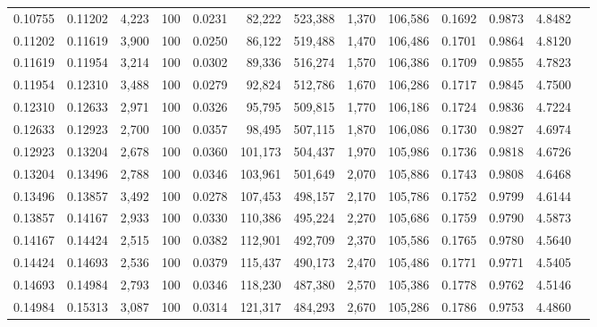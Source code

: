 \begin{tabular}{rrrrrrrrrrrrr}
0.10755 & 0.11202 & 4,223 & 100 &                                     0.0231 &  82,222 & 523,388 &   1,370 & 106,586 & 0.1692 & 0.9873 & 4.8482 \\
0.11202 & 0.11619 & 3,900 & 100 &                                     0.0250 &  86,122 & 519,488 &   1,470 & 106,486 & 0.1701 & 0.9864 & 4.8120 \\
0.11619 & 0.11954 & 3,214 & 100 &                                     0.0302 &  89,336 & 516,274 &   1,570 & 106,386 & 0.1709 & 0.9855 & 4.7823 \\
0.11954 & 0.12310 & 3,488 & 100 &                                     0.0279 &  92,824 & 512,786 &   1,670 & 106,286 & 0.1717 & 0.9845 & 4.7500 \\
0.12310 & 0.12633 & 2,971 & 100 &                                     0.0326 &  95,795 & 509,815 &   1,770 & 106,186 & 0.1724 & 0.9836 & 4.7224 \\
0.12633 & 0.12923 & 2,700 & 100 &                                     0.0357 &  98,495 & 507,115 &   1,870 & 106,086 & 0.1730 & 0.9827 & 4.6974 \\
0.12923 & 0.13204 & 2,678 & 100 &                                     0.0360 & 101,173 & 504,437 &   1,970 & 105,986 & 0.1736 & 0.9818 & 4.6726 \\
0.13204 & 0.13496 & 2,788 & 100 &                                     0.0346 & 103,961 & 501,649 &   2,070 & 105,886 & 0.1743 & 0.9808 & 4.6468 \\
0.13496 & 0.13857 & 3,492 & 100 &                                     0.0278 & 107,453 & 498,157 &   2,170 & 105,786 & 0.1752 & 0.9799 & 4.6144 \\
0.13857 & 0.14167 & 2,933 & 100 &                                     0.0330 & 110,386 & 495,224 &   2,270 & 105,686 & 0.1759 & 0.9790 & 4.5873 \\
0.14167 & 0.14424 & 2,515 & 100 &                                     0.0382 & 112,901 & 492,709 &   2,370 & 105,586 & 0.1765 & 0.9780 & 4.5640 \\
0.14424 & 0.14693 & 2,536 & 100 &                                     0.0379 & 115,437 & 490,173 &   2,470 & 105,486 & 0.1771 & 0.9771 & 4.5405 \\
0.14693 & 0.14984 & 2,793 & 100 &                                     0.0346 & 118,230 & 487,380 &   2,570 & 105,386 & 0.1778 & 0.9762 & 4.5146 \\
0.14984 & 0.15313 & 3,087 & 100 &                                     0.0314 & 121,317 & 484,293 &   2,670 & 105,286 & 0.1786 & 0.9753 & 4.4860 \\

\end{tabular}
